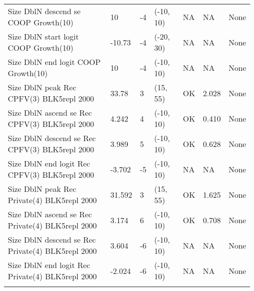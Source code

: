 \documentclass[11pt,
  english,
  letterpaper,
]{article}
\begin{document}
\begin{landscape}
\begin{longtable}[t]{>{\raggedright\arraybackslash}p{7.5cm}lllll>{\raggedright\arraybackslash}p{3.5cm}}
Size DblN descend se COOP Growth(10) & 10 & -4 & (-10, 10) & NA & NA & None\\
Size DblN start logit COOP Growth(10) & -10.73 & -4 & (-20, 30) & NA & NA & None\\
Size DblN end logit COOP Growth(10) & 10 & -4 & (-10, 10) & NA & NA & None\\
Size DblN peak Rec CPFV(3) BLK5repl 2000 & 33.78 & 3 & (15, 55) & OK & 2.028 & None\\
Size DblN ascend se Rec CPFV(3) BLK5repl 2000 & 4.242 & 4 & (-10, 10) & OK & 0.410 & None\\
Size DblN descend se Rec CPFV(3) BLK5repl 2000 & 3.989 & 5 & (-10, 10) & OK & 0.628 & None\\
Size DblN end logit Rec CPFV(3) BLK5repl 2000 & -3.702 & -5 & (-10, 10) & NA & NA & None\\
Size DblN peak Rec Private(4) BLK5repl 2000 & 31.592 & 3 & (15, 55) & OK & 1.625 & None\\
Size DblN ascend se Rec Private(4) BLK5repl 2000 & 3.174 & 6 & (-10, 10) & OK & 0.708 & None\\
Size DblN descend se Rec Private(4) BLK5repl 2000 & 3.604 & -6 & (-10, 10) & NA & NA & None\\
Size DblN end logit Rec Private(4) BLK5repl 2000 & -2.024 & -6 & (-10, 10) & NA & NA & None\\*
\end{longtable}
\endgroup{}
\end{landscape}
\endgroup{}

\newpage



\newpage

\begingroup\fontsize{10}{12}\selectfont
\begingroup\fontsize{10}{12}\selectfont
\end{document}

